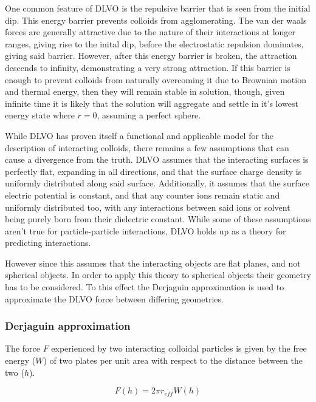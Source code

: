 One common feature of DLVO is the repulsive barrier that is seen from the initial dip. This energy barrier prevents colloids from agglomerating. The van der waals forces are generally attractive due to the nature of their interactions at longer ranges, giving rise to the inital dip, before the electrostatic repulsion dominates, giving said barrier. However, after this energy barrier is broken, the attraction descends to infinity, demonstrating a very strong attraction. If this barrier is enough to prevent colloids from naturally overcoming it due to Brownian motion and thermal energy, then they will remain stable in solution, though, given infinite time it is likely that the solution will aggregate and settle in it's lowest energy state where $r = 0$, assuming a perfect sphere.\cite{?}

While DLVO has proven itself a functional and applicable model for the description of interacting colloids, there remains a few assumptions that can cause a divergence from the truth. DLVO assumes that the interacting surfaces is perfectly flat, expanding in all directions, and that the surface charge density is uniformly distributed along said surface. Additionally, it assumes that the surface electric potential is constant, and that any counter ions remain static and uniformly distributed too, with any interactions between said ions or solvent being purely born from their dielectric constant. While some of these assumptions aren't true for particle-particle interactions, DLVO holds up as a theory for predicting interactions. \cite{particledep} \cite{effectHetSurf} \cite{colloidDepKin} \cite{chemDiscCharge} \cite{DLVOreview} 

However since this assumes that the interacting objects are flat planes, and not spherical objects. In order to apply this theory to spherical objects their geometry has to be considered. To this effect the Derjaguin approximation is used to approximate the DLVO force between differing geometries.

\subsubsection{Derjaguin approximation}

The force $F$ experienced by two interacting colloidal particles is given by the free energy ($W$) of two plates  per unit area with respect to the distance between the two ($h$). 

\begin{equation} %
F(h) = 2 \pi r_{eff} W(h)
\end{equation}

